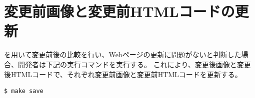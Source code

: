 \section{変更前画像と変更前HTMLコードの更新}\label{subsec:MixVRT_evaluate}
\toolName を用いて変更前後の比較を行い、Webページの更新に問題がないと判断した場合、開発者は下記の実行コマンドを実行する。
これにより、変更後画像と変更後HTMLコードで、それぞれ変更前画像と変更前HTMLコードを更新する。
\begin{lstlisting}[label=list:command2,frame=none,numbers=none,basicstyle={\normalsize \ttfamily \color[gray]{.15}}]
    $ make save
\end{lstlisting}







